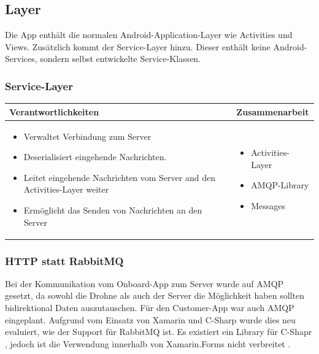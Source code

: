 \subsection{Layer}

Die App enthält die normalen Android-Application-Layer wie Activities und Views. Zusätzlich kommt der Service-Layer hinzu. Dieser enthält keine Android-Services, sondern selbst entwickelte Service-Klassen.

\subsubsection{Service-Layer}

\begin{tabular}{|p{}|p{}|} \hline
	\textbf{Verantwortlichkeiten} & \textbf{Zusammenarbeit} \\ \hline \hline
	
	\begin{itemize}
		\item Verwaltet Verbindung zum Server
		\item Deserialisiert eingehende Nachrichten.
		\item Leitet eingehende Nachrichten vom Server and den Activities-Layer weiter
		\item Ermöglicht das Senden von Nachrichten an den Server
	\end{itemize}&
	\begin{itemize}
		\item Activities-Layer
		\item AMQP-Library
		\item Messages
	\end{itemize}
	\\ \hline
\end{tabular}

\subsubsection{HTTP statt RabbitMQ}
Bei der Kommunikation vom Onboard-App zum Server wurde auf AMQP gesetzt, da sowohl die Drohne als auch der Server die Möglichkeit haben sollten bidirektional Daten auszutauschen. 
Für den Customer-App war auch AMQP eingeplant. Aufgrund vom Einsatz von Xamarin und C-Sharp wurde dies neu evaluiert, wie der Support für RabbitMQ ist.
Es existiert ein Library für C-Shapr \cite{easynetq}, jedoch ist die Verwendung innerhalb von Xamarin.Forms nicht verbreitet \cite{ampq-csharp}. 

